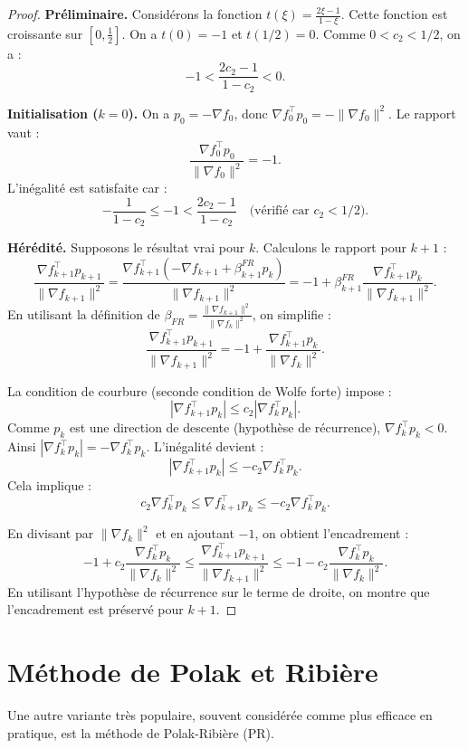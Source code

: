 \begin{proof}
\textbf{Préliminaire.} Considérons la fonction $t(\xi) = \frac{2\xi - 1}{1 - \xi}$.
Cette fonction est croissante sur $[0, \frac{1}{2}]$.
On a $t(0) = -1$ et $t(1/2) = 0$.
Comme $0 < c_2 < 1/2$, on a :
\[
-1 < \frac{2c_2 - 1}{1 - c_2} < 0.
\]

\textbf{Initialisation ($k=0$).}
On a $p_0 = -\nabla f_0$, donc $\nabla f_0^\top p_0 = -\|\nabla f_0\|^2$.
Le rapport vaut :
\[
\frac{\nabla f_0^\top p_0}{\|\nabla f_0\|^2} = -1.
\]
L'inégalité est satisfaite car :
\[
-\frac{1}{1-c_2} \le -1 < \frac{2c_2 - 1}{1 - c_2} \quad \text{(vérifié car } c_2 < 1/2 \text{)}.
\]

\textbf{Hérédité.} Supposons le résultat vrai pour $k$.
Calculons le rapport pour $k+1$ :
\[
\frac{\nabla f_{k+1}^\top p_{k+1}}{\|\nabla f_{k+1}\|^2} 
= \frac{\nabla f_{k+1}^\top (-\nabla f_{k+1} + \beta_{k+1}^{FR} p_k)}{\|\nabla f_{k+1}\|^2}
= -1 + \beta_{k+1}^{FR} \frac{\nabla f_{k+1}^\top p_k}{\|\nabla f_{k+1}\|^2}.
\]
En utilisant la définition de $\beta_{FR} = \frac{\|\nabla f_{k+1}\|^2}{\|\nabla f_k\|^2}$, on simplifie :
\[
\frac{\nabla f_{k+1}^\top p_{k+1}}{\|\nabla f_{k+1}\|^2} = -1 + \frac{\nabla f_{k+1}^\top p_k}{\|\nabla f_k\|^2}.
\]

La condition de courbure (seconde condition de Wolfe forte) impose :
\[
|\nabla f_{k+1}^\top p_k| \le c_2 |\nabla f_k^\top p_k|.
\]
Comme $p_k$ est une direction de descente (hypothèse de récurrence), $\nabla f_k^\top p_k < 0$. Ainsi $|\nabla f_k^\top p_k| = -\nabla f_k^\top p_k$.
L'inégalité devient :
\[
|\nabla f_{k+1}^\top p_k| \le -c_2 \nabla f_k^\top p_k.
\]
Cela implique :
\[
c_2 \nabla f_k^\top p_k \le \nabla f_{k+1}^\top p_k \le -c_2 \nabla f_k^\top p_k.
\]

En divisant par $\|\nabla f_k\|^2$ et en ajoutant $-1$, on obtient l'encadrement :
\[
-1 + c_2 \frac{\nabla f_k^\top p_k}{\|\nabla f_k\|^2} \le \frac{\nabla f_{k+1}^\top p_{k+1}}{\|\nabla f_{k+1}\|^2} \le -1 - c_2 \frac{\nabla f_k^\top p_k}{\|\nabla f_k\|^2}.
\]
En utilisant l'hypothèse de récurrence sur le terme de droite, on montre que l'encadrement est préservé pour $k+1$.
\end{proof}

\section{Méthode de Polak et Ribière}

Une autre variante très populaire, souvent considérée comme plus efficace en pratique, est la méthode de Polak-Ribière (PR).

